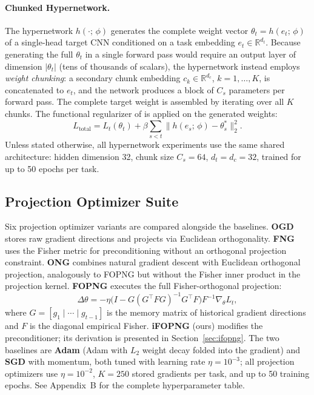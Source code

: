 \paragraph{Chunked Hypernetwork.}
The hypernetwork $h(\cdot;\,\phi)$ generates the complete weight vector
$\theta_t = h(e_t;\,\phi)$ of a single-head target CNN conditioned on a
task embedding $e_t \in \mathbb{R}^{d_t}$.  Because generating the full
$\theta_t$ in a single forward pass would require an output layer of dimension
$|\theta_t|$ (tens of thousands of scalars), the hypernetwork instead employs
\emph{weight chunking}: a secondary chunk embedding
$c_k \in \mathbb{R}^{d_c}$, $k=1,\ldots,K$, is concatenated to $e_t$, and the
network produces a block of $C_s$ parameters per forward pass.  The complete
target weight is assembled by iterating over all $K$ chunks.  The functional
regularizer of \citet{oswald_continual_2020} is applied on the generated
weights:
\begin{equation}
    L_{\text{total}} = L_t(\theta_t)
    + \beta \sum_{s < t} \bigl\|h(e_s;\,\phi) - \theta_s^*\bigr\|_2^2.
\end{equation}
Unless stated otherwise, all hypernetwork experiments use the same shared
architecture: hidden dimension 32, chunk size $C_s = 64$,
$d_t = d_c = 32$, trained for up to 50 epochs per task.

\subsection{Projection Optimizer Suite}
Six projection optimizer variants are compared alongside the baselines.
\textbf{OGD} \citep{farajtabar_orthogonal_2019} stores raw gradient directions
and projects via Euclidean orthogonality.
\textbf{FNG} uses the Fisher metric for preconditioning without an orthogonal
projection constraint.
\textbf{ONG} combines natural gradient descent with Euclidean orthogonal
projection, analogously to FOPNG but without the Fisher inner product in the
projection kernel.
\textbf{FOPNG} \citep{garg_fisher-orthogonal_2026} executes the full
Fisher-orthogonal projection:
\begin{equation}
    \Delta\theta = -\eta
    \bigl(I - G(G^\top F G)^{-1} G^\top F\bigr)
    F^{-1}\nabla_\theta L_t,
\end{equation}
where $G = [g_1 \mid \cdots \mid g_{t-1}]$ is the memory matrix of historical
gradient directions and $F$ is the diagonal empirical Fisher.
\textbf{iFOPNG} (ours) modifies the preconditioner; its derivation is presented
in Section~\ref{sec:ifopng}.
The two baselines are \textbf{Adam} (Adam with $L_2$ weight decay folded into
the gradient) and \textbf{SGD} with momentum, both tuned with learning rate
$\eta = 10^{-3}$; all projection optimizers use $\eta = 10^{-2}$, $K = 250$
stored gradients per task, and up to 50 training epochs.  See Appendix~B for
the complete hyperparameter table.

